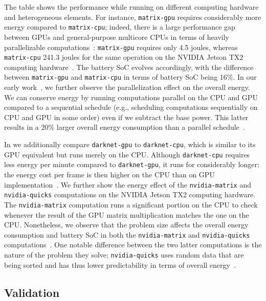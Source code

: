The table shows the performance while running on different computing hardware and heterogeneous elements. For instance, {\small\tt matrix-gpu} requires considerably more energy compared to {\small\tt matrix-cpu}; indeed, there is a large performance gap between GPUs and general-purpose multicore CPUs in terms of heavily parallelizable computations~\citep{kirk2016programming}: {\small\tt matrix-gpu} requires only 4.5 joules, whereas {\small\tt matrix-cpu} 241.3 joules for the same operation on the NVIDIA Jetson TX2 computing hardware~\citep{seewald2019coarse}. The battery SoC evolves accordingly, with the difference between {\small\tt matrix-gpu} and {\small\tt matrix-cpu} in terms of battery SoC being 16\%. In our early work~\citep{seewald2019coarse,seewald2019component}, we further observe the parallelization effect on the overall energy. We can conserve energy by running computations parallel on the CPU and GPU compared to a sequential schedule (e.g., scheduling computations sequentially on CPU and GPU in some order) even if we subtract the base power. This latter results in a 20\% larger overall energy consumption than a parallel schedule~\citep{seewald2019coarse}.

In  we additionally compare {\small\tt darknet-gpu} to {\small\tt darknet-cpu}, which is similar to its GPU equivalent but runs merely on the CPU. Although {\small\tt darknet-cpu} requires less energy per minute compared to {\small\tt darknet-gpu}, it runs for considerably longer; the energy cost per frame is then higher on the CPU than on GPU implementation~\citep{seewald2019coarse}. We further show the energy effect of the {\small\tt nvidia-matrix} and {\small\tt nvidia-quicks} computations on the NVIDIA Jetson TX2 computing hardware. The {\small\tt nvidia-matrix} computation runs a significant portion on the CPU to check whenever the result of the GPU matrix multiplication matches the one on the CPU. Nonetheless, we observe that the problem size affects the overall energy consumption and battery SoC in both the {\small\tt nvidia-matrix} and {\small\tt nvidia-quicks} computations~\citep{seewald2019coarse}. One notable difference between the two latter computations is the nature of the problem they solve; {\small\tt nvidia-quicks} uses random data that are being sorted and has thus lower predictability in terms of overall energy~\citep{seewald2019coarse}.

\subsection{Validation}

